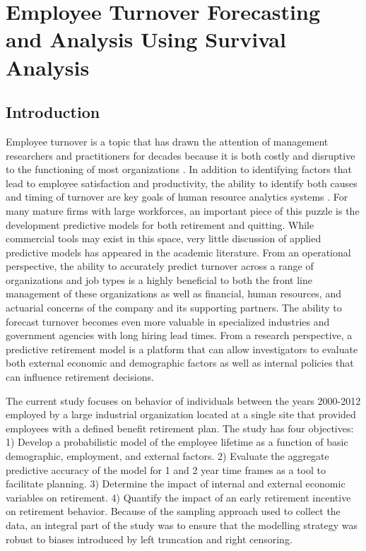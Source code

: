 \chapter{Employee Turnover Forecasting and Analysis Using Survival Analysis} \label{ch:surv}
\section{Introduction}
Employee turnover is a topic that has drawn the attention of management researchers and practitioners for decades because it is both costly and disruptive to the functioning of most organizations \citep{staw1980, mueller1989, kacmar2006}. In addition to identifying factors that lead to employee satisfaction and productivity, the ability to identify both causes and timing of turnover are key goals of human resource analytics systems \citep{IBM}. For many mature firms with large workforces, an important piece of this puzzle is the development predictive models for both retirement and quitting.  While commercial tools may exist in this space, very little discussion of applied predictive models has appeared in the academic literature.  From an operational perspective, the ability to accurately predict turnover across a range of organizations and job types is a highly beneficial to both the front line management of these organizations as well as financial, human resources, and actuarial concerns of the company and its supporting partners. The ability to forecast turnover becomes even more valuable in specialized industries and government agencies with long hiring lead times. From a research perspective, a predictive retirement model is a platform that can allow investigators to evaluate both external economic and demographic factors as well as internal policies that can influence retirement decisions.

The current study focuses on behavior of individuals between the years 2000-2012 employed by a large industrial organization located at a single site that provided employees with a defined benefit retirement plan.  The study has four objectives: 1) Develop a probabilistic model of the employee lifetime as a function of basic demographic, employment, and external factors.  2) Evaluate the aggregate predictive accuracy of the model for 1 and 2 year time frames as a tool to facilitate planning. 3) Determine the impact of internal and external economic variables on retirement. 4) Quantify the impact of an early retirement incentive on retirement behavior.  Because of the sampling approach used to collect the data, an integral part of the study was to ensure that the modelling strategy was robust to biases introduced by left truncation and right censoring.


